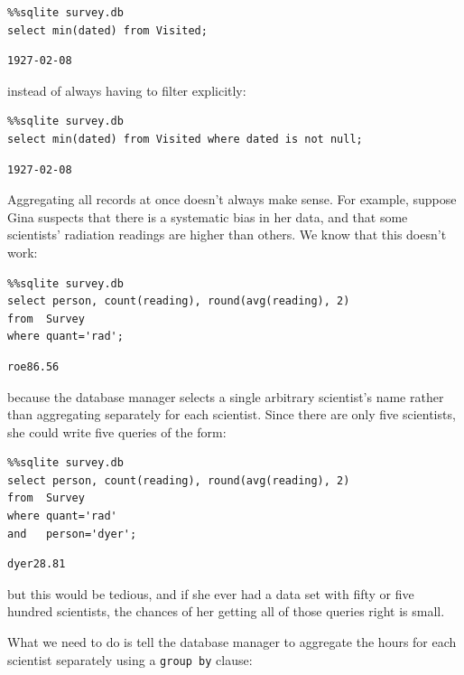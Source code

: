 \documentclass{book}
\begin{document}
\begin{verbatim}
%%sqlite survey.db
select min(dated) from Visited;
\end{verbatim}

\begin{verbatim}
1927-02-08
\end{verbatim}

instead of always having to filter explicitly:

\begin{verbatim}
%%sqlite survey.db
select min(dated) from Visited where dated is not null;
\end{verbatim}

\begin{verbatim}
1927-02-08
\end{verbatim}

Aggregating all records at once doesn't always make sense. For example,
suppose Gina suspects that there is a systematic bias in her data, and
that some scientists' radiation readings are higher than others. We know
that this doesn't work:

\begin{verbatim}
%%sqlite survey.db
select person, count(reading), round(avg(reading), 2)
from  Survey
where quant='rad';
\end{verbatim}

\begin{verbatim}
roe86.56
\end{verbatim}

because the database manager selects a single arbitrary scientist's name
rather than aggregating separately for each scientist. Since there are
only five scientists, she could write five queries of the form:

\begin{verbatim}
%%sqlite survey.db
select person, count(reading), round(avg(reading), 2)
from  Survey
where quant='rad'
and   person='dyer';
\end{verbatim}

\begin{verbatim}
dyer28.81
\end{verbatim}

but this would be tedious, and if she ever had a data set with fifty or
five hundred scientists, the chances of her getting all of those queries
right is small.

What we need to do is tell the database manager to aggregate the hours
for each scientist separately using a \texttt{group by} clause:
\end{document}
